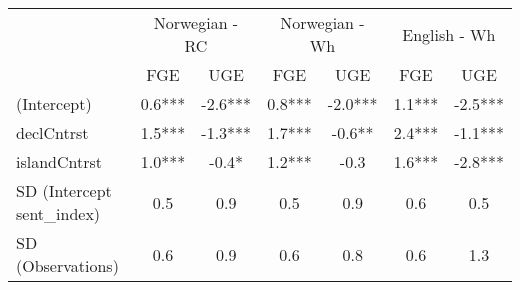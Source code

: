 \begin{longtable}{lcccccc}
\toprule
 & \multicolumn{2}{c}{Norwegian - RC} & \multicolumn{2}{c}{Norwegian - Wh} & \multicolumn{2}{c}{English - Wh} \\ 
\cmidrule(lr){2-3} \cmidrule(lr){4-5} \cmidrule(lr){6-7}
  & FGE & UGE & FGE & UGE & FGE & UGE \\ 
\midrule\addlinespace[2.5pt]
(Intercept) & 0.6*** & -2.6*** & 0.8*** & -2.0*** & 1.1*** & -2.5*** \\ 
declCntrst & 1.5*** & -1.3*** & 1.7*** & -0.6** & 2.4*** & -1.1*** \\ 
islandCntrst & 1.0*** & -0.4* & 1.2*** & -0.3 & 1.6*** & -2.8*** \\ 
SD (Intercept sent\_index) & 0.5 & 0.9 & 0.5 & 0.9 & 0.6 & 0.5 \\ 
SD (Observations) & 0.6 & 0.9 & 0.6 & 0.8 & 0.6 & 1.3 \\ 
\bottomrule
\end{longtable}

